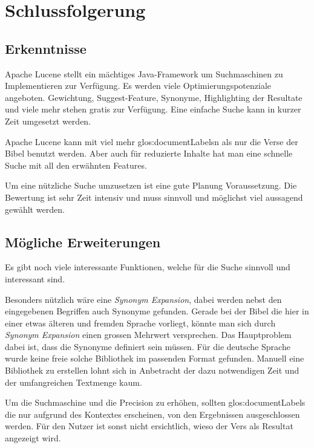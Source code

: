 \chapter{Schlussfolgerung}

\section{Erkenntnisse}
Apache Lucene stellt ein mächtiges Java-Framework um Suchmaschinen zu Implementieren zur Verfügung.
Es werden viele Optimierungspotenziale angeboten. Gewichtung, Suggest-Feature, Synonyme, Highlighting der Resultate und viele mehr stehen gratis zur Verfügung.
Eine einfache Suche kann in kurzer Zeit umgesetzt werden.

Apache Lucene kann mit viel mehr \glspl{glos:documentLabel}n als nur die Verse der Bibel benutzt werden. Aber auch für reduzierte Inhalte hat man eine schnelle Suche mit all den erwähnten Features.

Um eine nützliche Suche umzusetzen ist eine gute Planung Voraussetzung. Die Bewertung ist sehr Zeit intensiv und muss sinnvoll und möglichst viel aussagend gewählt werden.

\section{Mögliche Erweiterungen}
Es gibt noch viele interessante Funktionen, welche für die Suche sinnvoll und interessant sind.

Besonders nützlich wäre eine \textit{Synonym Expansion}, dabei werden nebst den eingegebenen Begriffen auch Synonyme gefunden.
Gerade bei der Bibel die hier in einer etwas älteren und fremden Sprache vorliegt, könnte man sich durch \textit{Synonym Expansion} einen grossen Mehrwert versprechen.
Das Hauptproblem dabei ist, dass die Synonyme definiert sein müssen.
Für die deutsche Sprache wurde keine freie solche Bibliothek im passenden Format gefunden.
Manuell eine Bibliothek zu erstellen lohnt sich in Anbetracht der dazu notwendigen Zeit und der umfangreichen Textmenge kaum.

Um die Suchmaschine und die Precision zu erhöhen, sollten \glspl{glos:documentLabel} die nur aufgrund des Kontextes erscheinen, von den Ergebnissen ausgeschlossen werden. Für den Nutzer ist sonst nicht ersichtlich, wieso der Vers als Resultat angezeigt wird.


